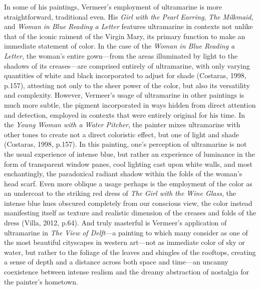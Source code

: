 In some of his paintings, Vermeer's employment of ultramarine is more
straightforward, traditional even. His \emph{Girl with the Pearl
Earring}, \emph{The Milkmaid}, and \emph{Woman in Blue Reading a Letter}
features ultramarine in contexts not unlike that of the iconic raiment
of the Virgin Mary, its primary function to make an immediate statement
of color. In the case of the \emph{Woman in Blue Reading a Letter}, the
woman's entire gown---from the areas illuminated by light to the
shadows of its creases---are comprised entirely of ultramarine, with
only varying quantities of white and black incorporated to adjust for
shade (Costaras, 1998, p.157), attesting not only to the sheer power of
the color, but also its versatility and complexity. However, Vermeer's
usage of ultramarine in other paintings is much more subtle, the pigment
incorporated in ways hidden from direct attention and detection,
employed in contexts that were entirely original for his time. In the
\emph{Young Woman with a Water Pitcher}, the painter mixes ultramarine
with other tones to create not a direct coloristic effect, but one of
light and shade (Costaras, 1998, p.157). In this painting, one's
perception of ultramarine is not the usual experience of intense blue,
but rather an experience of luminance in the form of transparent window
panes, cool lighting cast upon white walls, and most enchantingly, the
paradoxical radiant shadow within the folds of the woman's head scarf.
Even more oblique a usage perhaps is the employment of the color as an
undercoat to the striking red dress of \emph{The Girl with the Wine
Glass}, the intense blue hues obscured completely from our conscious
view, the color instead manifesting itself as texture and realistic
dimension of the creases and folds of the dress (Villa, 2012, p.64). And
truly masterful is Vermeer's application of ultramarine in \emph{The
View of Delft}---a painting to which many consider as one of the
most beautiful cityscapes in western art---not as immediate color of
sky or water, but rather to the foliage of the leaves and shingles of
the rooftops, creating a sense of depth and a distance across both space
and time---an uncanny coexistence between intense realism and the
dreamy abstraction of nostalgia for the painter's hometown.

